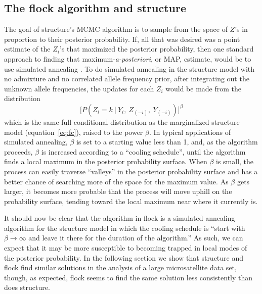 \subsection*{The {\sc flock} algorithm and {\sc structure}}
The goal of {\sc structure}'s MCMC algorithm is to sample from the space of 
$Z$'s in proportion to their posterior probability.  If, all that was desired
was a point estimate of the $Z_i$'s that maximized the posterior probability,
then one standard approach to finding that maximum-{\em a-posteriori}, or MAP, 
estimate, would be to use simulated annealing \citep{Kirkpatricketal1983}.
To do simulated annealing in the {\sc structure} model with no admixture and
no correlated allele frequency prior, after integrating out the unknown
allele frequencies, the updates for each $Z_i$ would be made from the 
distribution
\[
\biggl[P(Z_i=k~|~Y_i, ~Z_{(-i)},~Y_{(-i)})\biggr]^\beta
\]
which is the same full conditional distribution as the marginalized {\sc structure}
model (equation~\ref{eq:fc}), raised
to the power $\beta$.  In typical applications of simulated annealing,
$\beta$ is set to a starting value less than 1, and, as the algorithm proceeds,
$\beta$ is increased according to a ``cooling schedule''\citep{Hajek1988}, until
the algorithm finds a local maximum in the posterior probability surface.  
When $\beta$ is small, the process can easily traverse ``valleys''
in the posterior probability surface and has a better chance of searching
more of the space for the maximum value.  As $\beta$ gets larger, it becomes
more probable that the process will
move uphill on the probability surface, tending toward the local
maximum near where it currently is.    

It should now be clear that the algorithm in {\sc flock} is a simulated annealing 
algorithm for the {\sc structure} model in which the cooling schedule is
``start with $\beta\rightarrow\infty$ and leave it there for the duration of 
the algorithm.''  As such, we can expect that it may be more susceptible 
to becoming trapped in local modes of the posterior probability. 
In the following section we show that {\sc structure} and {\sc flock} find similar
solutions in the analysis of a large microsatellite data set, though, as expected,
{\sc flock} seems to find the same solution less consistently than does {\sc structure}.

